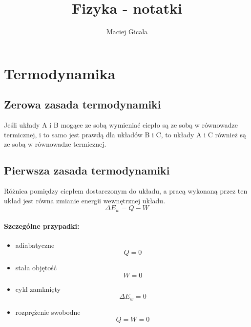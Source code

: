 \documentclass{article}
\title{Fizyka - notatki}
\author{Maciej Gicala}
\begin{document}
    \maketitle
    \section{Termodynamika}
        \subsection{Zerowa zasada termodynamiki}
        Jeśli układy A i B mogące ze sobą wymieniać ciepło są ze sobą w równowadze 
        termicznej, i to samo jest prawdą dla układów B i C, to układy A i C również 
        są ze sobą w równowadze termicznej.
        \subsection{Pierwsza zasada termodynamiki}
            Różnica pomiędzy ciepłem dostarczonym do układu, a pracą wykonaną przez ten 
            układ jest równa zmianie energii wewnętrznej układu.
            \begin{equation}
                \Delta E_w = Q - W
            \end{equation}
            \paragraph{Szczególne przypadki:}
                \begin{itemize}
                    \item adiabatyczne
                    \begin{equation}
                        Q = 0
                    \end{equation}
                    \item stała objętość
                    \begin{equation}
                        W = 0
                    \end{equation}
                    \item cykl zamknięty
                    \begin{equation}
                        \Delta E_w = 0
                    \end{equation}
                    \item rozprężenie swobodne
                    \begin{equation}
                        Q = W = 0
                    \end{equation}
                \end{itemize}
        \newpage
\end{document}
